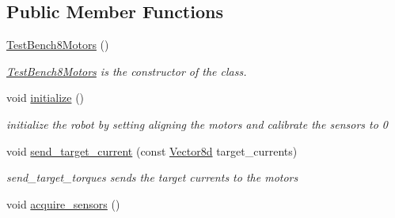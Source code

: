 \subsection*{Public Member Functions}
\begin{DoxyCompactItemize}
\item 
\hyperlink{classblmc__robots_1_1TestBench8Motors_a99006d989ac690956a2e1ab9b710de0f}{Test\+Bench8\+Motors} ()\hypertarget{classblmc__robots_1_1TestBench8Motors_a99006d989ac690956a2e1ab9b710de0f}{}\label{classblmc__robots_1_1TestBench8Motors_a99006d989ac690956a2e1ab9b710de0f}

\begin{DoxyCompactList}\small\item\em \hyperlink{classblmc__robots_1_1TestBench8Motors}{Test\+Bench8\+Motors} is the constructor of the class. \end{DoxyCompactList}\item 
void \hyperlink{classblmc__robots_1_1TestBench8Motors_aa8981496d1193752de3017a3eebb87dc}{initialize} ()\hypertarget{classblmc__robots_1_1TestBench8Motors_aa8981496d1193752de3017a3eebb87dc}{}\label{classblmc__robots_1_1TestBench8Motors_aa8981496d1193752de3017a3eebb87dc}

\begin{DoxyCompactList}\small\item\em initialize the robot by setting aligning the motors and calibrate the sensors to 0 \end{DoxyCompactList}\item 
void \hyperlink{classblmc__robots_1_1TestBench8Motors_a5194da9e85b4391e9ff6c5bf5a07faf2}{send\+\_\+target\+\_\+current} (const \hyperlink{common__header_8hpp_a98975ffbe0bca1296078e0350dfedd60}{Vector8d} target\+\_\+currents)\hypertarget{classblmc__robots_1_1TestBench8Motors_a5194da9e85b4391e9ff6c5bf5a07faf2}{}\label{classblmc__robots_1_1TestBench8Motors_a5194da9e85b4391e9ff6c5bf5a07faf2}

\begin{DoxyCompactList}\small\item\em send\+\_\+target\+\_\+torques sends the target currents to the motors \end{DoxyCompactList}\item 
void \hyperlink{classblmc__robots_1_1TestBench8Motors_a2792f7d4866c396ddfb88730a1644988}{acquire\+\_\+sensors} ()\hypertarget{classblmc__robots_1_1TestBench8Motors_a2792f7d4866c396ddfb88730a1644988}{}\label{classblmc__robots_1_1TestBench8Motors_a2792f7d4866c396ddfb88730a1644988}


\end{DoxyCompactItemize}
